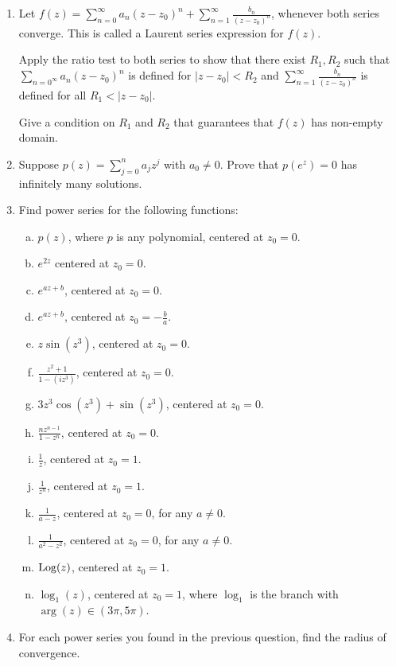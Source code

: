 \begin{enumerate}
\item Let $f(z) = \sum_{n = 0}^\infty a_n(z-z_0)^n + \sum_{n = 1}^\infty \frac{b_n}{(z-z_0)^n}$, whenever both series converge. This is called a Laurent series expression for $f(z)$.

Apply the ratio test to both series to show that there exist $R_1,R_2$ such that $\sum_{n = 0^\infty} a_n(z-z_0)^n$ is defined for $|z-z_0| < R_2$ and $\sum_{n=1}^\infty \frac{b_n}{(z-z_0)^n}$ is defined for all $R_1 < |z-z_0|$.

Give a condition on $R_1$ and $R_2$ that guarantees that $f(z)$ has non-empty domain.

\item Suppose $p(z) = \sum_{j = 0}^n a_jz^j$ with $a_0\ne 0$. Prove that $p(e^z) = 0$ has infinitely many solutions.

\item Find power series for the following functions:

\begin{enumerate}[a)]
\item $p(z)$, where $p$ is any polynomial, centered at $z_0 = 0$.
\item $e^{2z}$ centered at $z_0 = 0$.
\item $e^{az + b}$, centered at $z_0 = 0$.
\item $e^{az + b}$, centered at $z_0 = -\frac{b}{a}$.
\item $z\sin(z^3)$, centered at $z_ 0 = 0$.
\item $\frac{z^2 + 1}{1 - (iz^3)}$, centered at $z_0 = 0$.
\item $3z^3\cos(z^3) + \sin(z^3)$, centered at $z_0 = 0$.
\item $\frac{nz^{n-1}}{1 - z^n}$, centered at $z_0 = 0$.
\item $\frac{1}{z}$, centered at $z_0 = 1$.
\item $\frac{1}{z^n}$, centered at $z_0 = 1$.
\item $\frac{1}{a - z}$, centered at $z_0 = 0$, for any $a\ne 0$.
\item $\frac{1}{a^2 - z^2}$, centered at $z_0 = 0$, for any $a\ne 0$.
\item $\mathrm{Log}(z)$, centered at $z_0 = 1$.
\item $\log_1(z)$, centered at $z_0 = 1$, where $\log_1$ is the branch with $\arg(z) \in (3\pi,5\pi)$.
\end{enumerate}

\item For each power series you found in the previous question, find the radius of convergence.


\end{enumerate}
